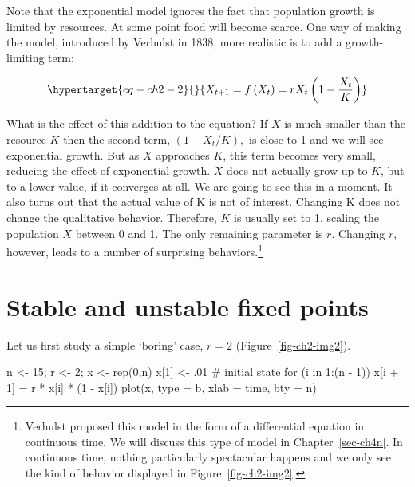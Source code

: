 \documentclass[
  a4paper,
  DIV=11,
  numbers=noendperiod]{scrreprt}
\newenvironment{Shaded}{\begin{snugshade}}{\end{snugshade}}
\newcommand{\AttributeTok}[1]{\textcolor[rgb]{0.40,0.45,0.13}{#1}}
\newcommand{\CommentTok}[1]{\textcolor[rgb]{0.37,0.37,0.37}{#1}}
\newcommand{\ControlFlowTok}[1]{\textcolor[rgb]{0.00,0.23,0.31}{#1}}
\newcommand{\DecValTok}[1]{\textcolor[rgb]{0.68,0.00,0.00}{#1}}
\newcommand{\FunctionTok}[1]{\textcolor[rgb]{0.28,0.35,0.67}{#1}}
\newcommand{\NormalTok}[1]{\textcolor[rgb]{0.00,0.23,0.31}{#1}}
\newcommand{\OtherTok}[1]{\textcolor[rgb]{0.00,0.23,0.31}{#1}}
\newcommand{\SpecialCharTok}[1]{\textcolor[rgb]{0.37,0.37,0.37}{#1}}
\newcommand{\StringTok}[1]{\textcolor[rgb]{0.13,0.47,0.30}{#1}}
\begin{document}
Note that the exponential model ignores the fact that population growth
is limited by resources. At some point food will become scarce. One way
of making the model, introduced by Verhulst in 1838, more realistic is
to add a growth-limiting term:

\begin{equation}\protect\hypertarget{eq-ch2-2}{}{
X_{t + 1} = f\left( X_{t} \right) = rX_{t}\left( 1 - \frac{X_{t}}{K} \right)}\label{eq-ch2-2}\end{equation}

What is the effect of this addition to the equation? If \(X\) is much
smaller than the resource \(K\) then the second term,
\(\left( 1 - {X_{t}}/{K} \right),\) is close to 1 and we will see
exponential growth. But as \(X\) approaches \(K\), this term becomes
very small, reducing the effect of exponential growth. \(X\) does not
actually grow up to \(K\), but to a lower value, if it converges at all.
We are going to see this in a moment. It also turns out that the actual
value of K is not of interest. Changing K does not change the
qualitative behavior. Therefore, \(K\) is usually set to 1, scaling the
population \(X\) between 0 and 1. The only remaining parameter is \(r\).
Changing \(r\), however, leads to a number of surprising
behaviors.\footnote{Verhulst proposed this model in the form of a
  differential equation in continuous time. We will discuss this type of
  model in Chapter~\ref{sec-ch4n}. In continuous time, nothing
  particularly spectacular happens and we only see the kind of behavior
  displayed in Figure~\ref{fig-ch2-img2}.}

\hypertarget{sec-Stable-and-unstable-fixed-points}{%
\section{Stable and unstable fixed
points}\label{sec-Stable-and-unstable-fixed-points}}

Let us first study a simple `boring' case, \(r = 2\)
(Figure~\ref{fig-ch2-img2}).

\begin{Shaded}
\begin{Highlighting}[]
\NormalTok{n }\OtherTok{\textless{}{-}} \DecValTok{15}\NormalTok{; r }\OtherTok{\textless{}{-}} \DecValTok{2}\NormalTok{; x }\OtherTok{\textless{}{-}} \FunctionTok{rep}\NormalTok{(}\DecValTok{0}\NormalTok{,n)}
\NormalTok{x[}\DecValTok{1}\NormalTok{] }\OtherTok{\textless{}{-}}\NormalTok{ .}\DecValTok{01} \CommentTok{\# initial state}
\ControlFlowTok{for}\NormalTok{ (i }\ControlFlowTok{in} \DecValTok{1}\SpecialCharTok{:}\NormalTok{(n }\SpecialCharTok{{-}} \DecValTok{1}\NormalTok{))}
\NormalTok{  x[i }\SpecialCharTok{+} \DecValTok{1}\NormalTok{] }\OtherTok{=}\NormalTok{ r }\SpecialCharTok{*}\NormalTok{ x[i] }\SpecialCharTok{*}\NormalTok{ (}\DecValTok{1} \SpecialCharTok{{-}}\NormalTok{ x[i])}
\FunctionTok{plot}\NormalTok{(x, }\AttributeTok{type =} \StringTok{\textquotesingle{}b\textquotesingle{}}\NormalTok{, }\AttributeTok{xlab =} \StringTok{\textquotesingle{}time\textquotesingle{}}\NormalTok{, }\AttributeTok{bty =} \StringTok{\textquotesingle{}n\textquotesingle{}}\NormalTok{)}
\end{Highlighting}
\end{Shaded}
\end{document}
